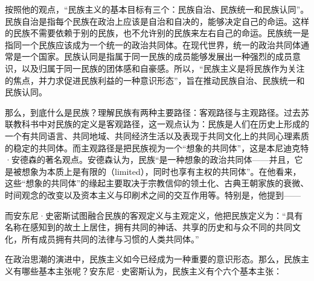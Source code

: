 
按照他的观点，“民族主义的基本目标有三个：民族自治、民族统一和民族认同”。民族自治是指每个民族在政治上应该是自治和自决的，能够决定自己的命运。这样的民族不需要依赖于别的民族，也不允许别的民族来左右自己的命运。民族统一是指同一个民族应该成为一个统一的政治共同体。在现代世界，统一的政治共同体通常是一个国家。民族认同是指属于同一民族的成员能够发展出一种强烈的成员意识，以及归属于同一民族的团体感和自豪感。所以，“民族主义是将民族作为关注的焦点，并力求促进民族利益的一种意识形态”，旨在推动民族自治、民族统一和民族认同。

那么，到底什么是民族？理解民族有两种主要路径：客观路径与主观路径。过去苏联教科书中对民族的定义是客观路径，这一观点认为：民族是人们在历史上形成的一个有共同语言、共同地域、共同经济生活以及表现于共同文化上的共同心理素质的稳定的共同体。而主观路径是把民族视为一个“想象的共同体”，这是本尼迪克特·安德森的著名观点。安德森认为，民族“是一种想象的政治共同体——并且，它是被想象为本质上是有限的（limited），同时也享有主权的共同体”。在他看来，这些“想象的共同体”的缘起主要取决于宗教信仰的领土化、古典王朝家族的衰微、时间观念的改变以及资本主义与印刷术之间的交互作用等。特别是，他提到——


而安东尼·史密斯试图融合民族的客观定义与主观定义，他把民族定义为：“具有名称在感知到的故土上居住，拥有共同的神话、共享的历史和与众不同的共同文化，所有成员拥有共同的法律与习惯的人类共同体。”

在政治思潮的演进中，民族主义如今已经成为一种重要的意识形态。那么，民族主义有哪些基本主张呢？安东尼·史密斯认为，民族主义有个六个基本主张：

